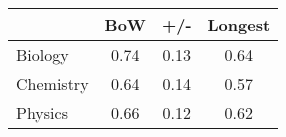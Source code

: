 \begin{tabular}{lcc|c}
\toprule
{} &   BoW &   +/- &  Longest \\
\midrule
Biology   &  0.74 &  0.13 &     0.64 \\
Chemistry &  0.64 &  0.14 &     0.57 \\
Physics   &  0.66 &  0.12 &     0.62 \\
\bottomrule
\end{tabular}
